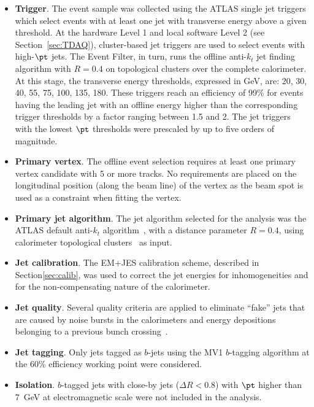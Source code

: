 \begin{itemize}
\item
\textbf{Trigger}. The event sample was collected  using the ATLAS single jet triggers which select events with at least one jet with transverse energy above a given threshold.  At the hardware Level 1 and local software Level 2 (see Section~\ref{sec:TDAQ}), cluster-based jet triggers are used to select events with high-$\pt$ jets. The Event Filter, in turn, runs  the offline anti-$k_t$ jet finding algorithm with $R = 0.4$ on topological clusters over the complete calorimeter.  At this stage, the transverse energy thresholds, expressed in GeV, are: 20, 30, 40, 55, 75, 100, 135, 180. These triggers reach an efficiency of 99\% for events having the leading jet with an offline energy higher than the corresponding trigger thresholds by a factor ranging between 1.5 and 2. The jet triggers with the lowest $\pt$ thresholds were prescaled by up to five orders of magnitude. %
\item
\textbf{Primary vertex}.  The offline event selection requires at least one primary vertex candidate with 5 or more tracks.  No requirements are placed on the longitudinal position (along the beam line) of the vertex as the beam spot is used as a constraint when fitting the vertex. 
\item
\textbf{Primary jet algorithm}. The jet algorithm selected for the analysis was the ATLAS default anti-$k_t$ algorithm~\cite{antiktalg}, with a distance parameter $R = 0.4$, using calorimeter topological clusters~\cite{topoClusters} as input.
\item
\textbf{Jet calibration}.  The EM+JES calibration scheme, described in Section\ref{sec:calib}, was used to correct the jet energies for inhomogeneities and for the non-compensating nature of the calorimeter.
\item
\textbf{Jet quality}.  Several quality criteria are applied to eliminate ``fake'' jets that are caused by noise bursts in the calorimeters and energy depositions belonging to a previous bunch crossing~\cite{ATLAS-CONF-2012-020}.
\item
\textbf{Jet tagging}.  Only jets tagged as $b$-jets using the MV1 $b$-tagging algorithm at the 60\% efficiency working point were considered.
\item
\textbf{Isolation}.  $b$-tagged jets with close-by jets ($\Delta R < 0.8$) with $\pt$ higher than 7~GeV at electromagnetic scale were not included in the analysis.
\end{itemize}

